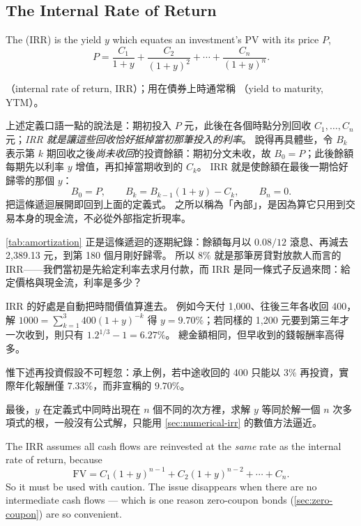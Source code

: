 \subsection{The Internal Rate of Return}

\begin{definition}
	The  (IRR) is the yield $y$ which equates an investment's PV with its price $P$,
	\[
		P = \frac{C_{1}}{1+y} + \frac{C_{2}}{(1+y)^{2}}
		+ \cdots + \frac{C_{n}}{(1+y)^{n}} .
	\]
\end{definition}

\suppstart
\begin{remark}
	（internal rate of return, IRR）；用在債券上時通常稱 （yield to maturity, YTM）。

	上述定義口語一點的說法是：期初投入 $P$ 元，此後在各個時點分別回收 $C_{1}, \ldots, C_{n}$ 元；\emph{IRR 就是讓這些回收恰好抵掉當初那筆投入的利率}。
	說得再具體些，令 $B_{k}$ 表示第 $k$ 期回收之後\emph{尚未收回}的投資餘額：期初分文未收，故 $B_{0} = P$；此後餘額每期先以利率 $y$ 增值，再扣掉當期收到的 $C_{k}$。
	IRR 就是使餘額在最後一期恰好歸零的那個 $y$：
	\[
		B_{0} = P, \qquad B_{k} = B_{k-1}(1+y) - C_{k}, \qquad B_{n} = 0 .
	\]
	把這條遞迴展開即回到上面的定義式。
	之所以稱為「內部」，是因為算它只用到交易本身的現金流，不必從外部指定折現率。

	\autoref{tab:amortization} 正是這條遞迴的逐期紀錄：餘額每月以 $0.08/12$ 滾息、再減去 2,389.13 元，到第 180 個月剛好歸零。
	所以 $8\%$ 就是那筆房貸對放款人而言的 IRR——我們當初是先給定利率去求月付款，而 IRR 是同一條式子反過來問：給定價格與現金流，利率是多少？

	IRR 的好處是自動把時間價值算進去。
	例如今天付 1,000、往後三年各收回 400，解 $1000 = \sum_{k=1}^{3} 400(1+y)^{-k}$ 得 $y = 9.70\%$；若同樣的 1,200 元要到第三年才一次收到，則只有 $1.2^{1/3}-1 = 6.27\%$。
	總金額相同，但早收到的錢報酬率高得多。

	惟下述再投資假設不可輕忽：承上例，若中途收回的 400 只能以 $3\%$ 再投資，實際年化報酬僅 $7.33\%$，而非宣稱的 $9.70\%$。

	最後，$y$ 在定義式中同時出現在 $n$ 個不同的次方裡，求解 $y$ 等同於解一個 $n$ 次多項式的根，一般沒有公式解，只能用 \autoref{sec:numerical-irr} 的數值方法逼近。
\end{remark}
\suppend

\begin{remark}
	The IRR assumes all cash flows are reinvested at the \emph{same} rate as the internal rate of return, because
	\[
		\mathrm{FV} = C_{1}(1+y)^{n-1} + C_{2}(1+y)^{n-2} + \cdots + C_{n} .
	\]
	So it must be used with caution.
	The issue disappears when there are no intermediate cash flows --- which is one reason zero-coupon bonds (\autoref{sec:zero-coupon}) are so convenient.
\end{remark}


